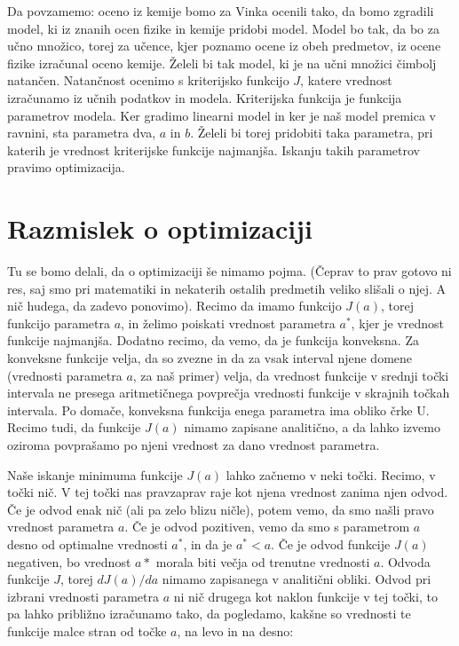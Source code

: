 Da povzamemo: oceno iz kemije bomo za Vinka ocenili tako, da bomo
zgradili model, ki iz znanih ocen fizike in kemije pridobi
model. Model bo tak, da bo za učno množico, torej za učence, kjer
poznamo ocene iz obeh predmetov, iz ocene fizike izračunal oceno
kemije. Želeli bi tak model, ki je na učni množici čimbolj
natančen. Natančnost ocenimo s kriterijsko funkcijo $J$, katere
vrednost izračunamo iz učnih podatkov in modela. Kriterijska funkcija
je funkcija parametrov modela. Ker gradimo linearni model in ker je
naš model premica v ravnini, sta parametra dva, $a$ in $b$. Želeli bi
torej pridobiti taka parametra, pri katerih je vrednost kriterijske
funkcije najmanjša. Iskanju takih parametrov pravimo optimizacija.

\section{Razmislek o optimizaciji}

Tu se bomo delali, da o optimizaciji še nimamo pojma. (Čeprav to prav
gotovo ni res, saj smo pri matematiki in nekaterih ostalih predmetih
veliko slišali o njej. A nič hudega, da zadevo ponovimo). Recimo da
imamo funkcijo $J(a)$, torej funkcijo parametra $a$, in želimo poiskati
vrednost parametra $a^*$, kjer je vrednost funkcije najmanjša. Dodatno
recimo, da vemo, da je funkcija konveksna. Za konveksne funkcije
velja, da so zvezne in da za vsak interval njene domene (vrednosti
parametra $a$, za naš primer) velja, da vrednost funkcije v srednji
točki intervala ne presega aritmetičnega povprečja vrednosti funkcije
v skrajnih točkah intervala. Po domače, konveksna funkcija enega
parametra ima obliko črke U. Recimo tudi, da funkcije $J(a)$ nimamo
zapisane analitično, a da lahko izvemo oziroma povprašamo po njeni
vrednost za dano vrednost parametra.

Naše iskanje minimuma funkcije $J(a)$ lahko začnemo v neki
točki. Recimo, v točki nič. V tej točki nas pravzaprav raje kot njena
vrednost zanima njen odvod. Če je odvod enak nič (ali pa zelo blizu
ničle), potem vemo, da smo našli pravo vrednost parametra $a$. Če je
odvod pozitiven, vemo da smo s parametrom $a$ desno od optimalne
vrednosti $a^*$, in da je $a^*<a$. Če je odvod funkcije $J(a)$
negativen, bo vrednost $a*$ morala biti večja od trenutne vrednosti
$a$. Odvoda funkcije $J$, torej $dJ(a)/da$ nimamo zapisanega v
analitični obliki. Odvod pri izbrani vrednosti parametra $a$ ni nič
drugega kot naklon funkcije v tej točki, to pa lahko približno
izračunamo tako, da pogledamo, kakšne so vrednosti te funkcije malce
stran od točke $a$, na levo in na desno:

